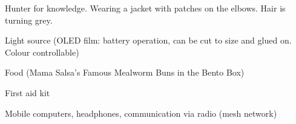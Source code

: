 \begin{npcBox}[title=Books]
    \begin{npcDescription}
    Hunter for knowledge. Wearing a jacket with patches on the elbows. Hair is turning grey.
    \end{npcDescription}


    \begin{equipment}
    \item Light source (OLED film: battery operation, can be cut to size and glued on. Colour controllable)
    \item Food (Mama Salsa's Famous Mealworm Buns in the Bento Box)
    \item First aid kit
    \item Mobile computers, headphones, communication via radio (mesh network)
    \end{equipment}
    
\end{npcBox}


